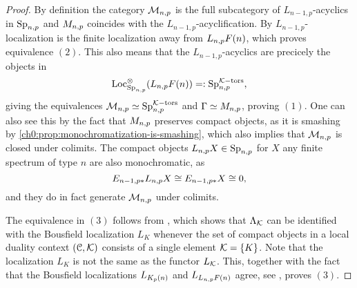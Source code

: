 \begin{proof}
    By definition the category $\mathcal{M}_{n,p}$ is the full subcategory of $L_{n-1,p}$-acyclics in $\mathrm{Sp}_{n,p}$ and $M_{n,p}$ coincides with the $L_{n-1,p}$-acyclification. By \cite[6.10]{hovey-strickland_99} $L_{n-1,p}$-localization is the finite localization away from $L_{n,p} F(n)$, which proves equivalence $(2)$. This also means that the $L_{n-1,p}$-acyclics are precicely the objects in 
    \[\operatorname{Loc}^\otimes_{\mathrm{Sp}_{n,p}}(L_{n,p} F(n))=:\mathrm{Sp}_{n,p}^{\mathcal{K}-\mathrm{tors}},\]
    giving the equivalences $\mathcal{M}_{n,p} \simeq \mathrm{Sp}_{n,p}^{\mathcal{K}-\mathrm{tors}}$ and $\Gamma \simeq M_{n,p}$, proving $(1)$. One can also see this by the fact that $M_{n,p}$ preserves compact objects, as it is smashing by \cref{ch0:prop:monochromatization-is-smashing}, which also implies that $\mathcal{M}_{n,p}$ is closed under colimits. The compact objects $L_{n,p} X\in \mathrm{Sp}_{n,p}$ for $X$ any finite spectrum of type $n$ are also monochromatic, as 
    \[E_{n-1,p *} L_{n,p} X \cong E_{n-1,p *}X\cong 0,\]
    and they do in fact generate $\mathcal{M}_{n,p}$ under colimits. 



    
    

    The equivalence in $(3)$ follows from \cite[2.34]{barthel-heard-valenzuela_2018}, which shows that $\Lambda_{\mathcal{K}}$ can be identified with the Bousfield localization $L_K$ whenever the set of compact objects in a local duality context $(\EuScript{C}, \mathcal{K})$ consists of a single element $\mathcal{K}=\{K\}$. Note that the localization $L_K$ is not the same as the functor $L_{\mathcal{K}}$. This, together with the fact that the Bousfield localizations $L_{K_p(n)}$ and $L_{L_{n,p} F(n)}$ agree, see \cite[7.1]{hovey-strickland_99}, proves $(3)$. 
\end{proof}

